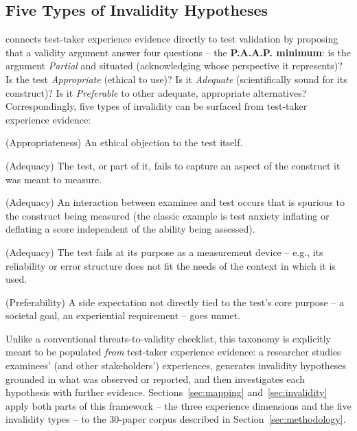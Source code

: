 \documentclass[11pt]{article}
\begin{document}
\subsection{Five Types of Invalidity Hypotheses}

\citet{araneda2023dissertation} connects test-taker experience evidence directly to test validation by proposing that a validity argument answer four questions -- the \textbf{P.A.A.P. minimum}: is the argument \emph{Partial} and situated (acknowledging whose perspective it represents)? Is the test \emph{Appropriate} (ethical to use)? Is it \emph{Adequate} (scientifically sound for its construct)? Is it \emph{Preferable} to other adequate, appropriate alternatives? Correspondingly, five types of invalidity can be surfaced from test-taker experience evidence:

\begin{description}[leftmargin=3.6cm, style=nextline]
    \item[Value rejection] (Appropriateness) An ethical objection to the test itself.
    \item[Construct under-representation] (Adequacy) The test, or part of it, fails to capture an aspect of the construct it was meant to measure.
    \item[Construct-irrelevant interaction] (Adequacy) An interaction between examinee and test occurs that is spurious to the construct being measured (the classic example is test anxiety inflating or deflating a score independent of the ability being assessed).
    \item[Purpose misfit] (Adequacy) The test fails at its purpose as a measurement device -- e.g., its reliability or error structure does not fit the needs of the context in which it is used.
    \item[Failed test expectation] (Preferability) A side expectation not directly tied to the test's core purpose -- a societal goal, an experiential requirement -- goes unmet.
\end{description}

Unlike a conventional threats-to-validity checklist, this taxonomy is explicitly meant to be populated \emph{from} test-taker experience evidence: a researcher studies examinees' (and other stakeholders') experiences, generates invalidity hypotheses grounded in what was observed or reported, and then investigates each hypothesis with further evidence. Sections~\ref{sec:mapping} and~\ref{sec:invalidity} apply both parts of this framework -- the three experience dimensions and the five invalidity types -- to the 30-paper corpus described in Section~\ref{sec:methodology}.
\end{document}
